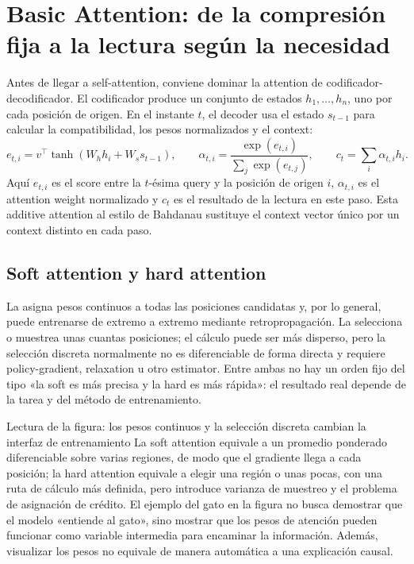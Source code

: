 \section{Basic Attention: de la compresión fija a la lectura según la necesidad}

Antes de llegar a self-attention, conviene dominar la attention de codificador-decodificador. El codificador produce un conjunto de estados $h_1,\ldots,h_n$, uno por cada posición de origen. En el instante $t$, el decoder usa el estado $s_{t-1}$ para calcular la compatibilidad, los pesos normalizados y el context:
\[
e_{t,i}=v^\top\tanh(W_hh_i+W_ss_{t-1}),\qquad
\alpha_{t,i}=\frac{\exp(e_{t,i})}{\sum_j\exp(e_{t,j})},\qquad
c_t=\sum_i\alpha_{t,i}h_i.
\]
Aquí $e_{t,i}$ es el score entre la $t$-ésima query y la posición de origen $i$, $\alpha_{t,i}$ es el attention weight normalizado y $c_t$ es el resultado de la lectura en este paso. Esta additive attention al estilo de Bahdanau sustituye el context vector único por un context distinto en cada paso.

\subsection{Soft attention y hard attention}

La  asigna pesos continuos a todas las posiciones candidatas y, por lo general, puede entrenarse de extremo a extremo mediante retropropagación. La  selecciona o muestrea unas cuantas posiciones; el cálculo puede ser más disperso, pero la selección discreta normalmente no es diferenciable de forma directa y requiere policy-gradient, relaxation u otro estimator. Entre ambas no hay un orden fijo del tipo «la soft es más precisa y la hard es más rápida»: el resultado real depende de la tarea y del método de entrenamiento.


\begin{knowledgebox}{Lectura de la figura: los pesos continuos y la selección discreta cambian la interfaz de entrenamiento}
La soft attention equivale a un promedio ponderado diferenciable sobre varias regiones, de modo que el gradiente llega a cada posición; la hard attention equivale a elegir una región o unas pocas, con una ruta de cálculo más definida, pero introduce varianza de muestreo y el problema de asignación de crédito. El ejemplo del gato en la figura no busca demostrar que el modelo «entiende al gato», sino mostrar que los pesos de atención pueden funcionar como variable intermedia para encaminar la información. Además, visualizar los pesos no equivale de manera automática a una explicación causal.
\end{knowledgebox}

